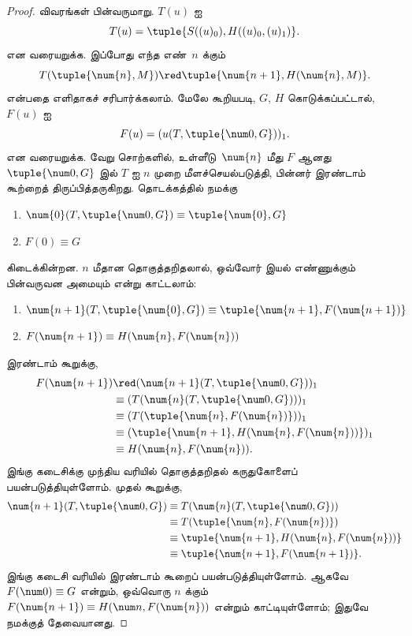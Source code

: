 \documentclass[../../../include/open-logic-section]{subfiles}
\begin{document}
\begin{proof}
விவரங்கள் பின்வருமாறு. $T(u)$ ஐ
\[
T(u) = \tuple{S((u)_0), H((u)_0,(u)_1)}.
\]
என வரையறுக்க. இப்போது எந்த எண்~$n$ க்கும்
\[
T(\tuple{\num{n}, M}) \red \tuple{\num{n+1}, H(\num{n}, M)}.
\]
என்பதை எளிதாகச் சரிபார்க்கலாம். மேலே கூறியபடி, $G$, $H$ கொடுக்கப்பட்டால்,
~$F(u)$ ஐ
\[
F(u) = (u(T,\tuple{\num 0, G}))_1.
\]
என வரையறுக்க. வேறு சொற்களில், உள்ளீடு~$\num{n}$ மீது $F$ ஆனது
$\tuple{\num 0, G}$ இல் $T$ ஐ $n$ முறை மீளச்செயல்படுத்தி, பின்னர் இரண்டாம்
கூற்றைத் திருப்பித்தருகிறது. தொடக்கத்தில் நமக்கு
\begin{enumerate}
\item $\num{0} (T, \tuple{\num 0, G}) \equiv \tuple{\num{0}, G}$
\item $F(\num{0}) \equiv G$
\end{enumerate}
கிடைக்கின்றன. $n$ மீதான தொகுத்தறிதலால், ஒவ்வோர் இயல் எண்ணுக்கும் பின்வருவன
அமையும் என்று காட்டலாம்:
\begin{enumerate}
\item $\num{n+1}(T, \tuple{\num{0}, G}) \equiv \tuple{\num{n+1}, F(\num{n+1})}$
\item $F(\num{n+1}) \equiv H(\num{n}, F(\num{n}))$
\end{enumerate}
இரண்டாம் கூறுக்கு,
\begin{align*}
F(\num{n+1}) & \red (\num{n+1}(T, \tuple{\num 0, G}))_1 \\
& \equiv (T(\num{n} (T, \tuple{\num 0, G})))_1 \\
& \equiv (T(\tuple{\num{n}, F(\num{n})}))_1 \\
& \equiv (\tuple{\num{n+1}, H(\num{n}, F(\num{n}))})_1 \\
& \equiv H(\num{n}, F(\num{n})).
\end{align*}
இங்கு கடைசிக்கு முந்திய வரியில் தொகுத்தறிதல் கருதுகோளைப் பயன்படுத்தியுள்ளோம்.
முதல் கூறுக்கு,
\begin{align*}
\num{n+1} (T, \tuple{\num 0, G}) &
\equiv T(\num{n} (T, \tuple{\num 0, G})) \\
& \equiv T( \tuple{\num{n}, F(\num{n})}) \\
& \equiv \tuple{\num{n+1}, H(\num{n}, F(\num{n}))} \\
& \equiv \tuple{\num{n+1}, F(\num{n+1})}.
\end{align*}
இங்கு கடைசி வரியில் இரண்டாம் கூறைப் பயன்படுத்தியுள்ளோம். ஆகவே
$F(\num 0) \equiv G$ என்றும், ஒவ்வொரு $n$ க்கும்
$F(\num {n+1}) \equiv H(\num n, F(\num{n}))$ என்றும் காட்டியுள்ளோம்;
இதுவே நமக்குத் தேவையானது.
\end{proof}
\end{document}
